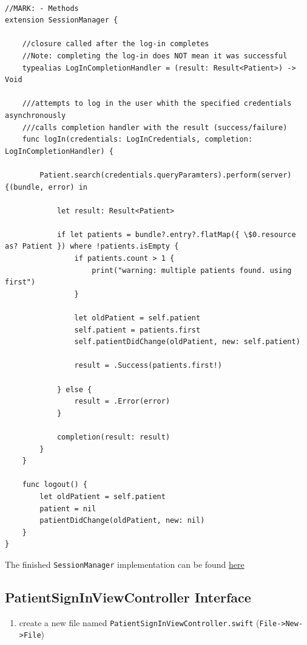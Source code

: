 \documentclass{article}
\begin{document}
\begin{verbatim}

//MARK: - Methods
extension SessionManager {

    //closure called after the log-in completes
    //Note: completing the log-in does NOT mean it was successful
    typealias LogInCompletionHandler = (result: Result<Patient>) -> Void

    ///attempts to log in the user whith the specified credentials asynchronously
    ///calls completion handler with the result (success/failure)
    func logIn(credentials: LogInCredentials, completion: LogInCompletionHandler) {

        Patient.search(credentials.queryParamters).perform(server) {(bundle, error) in

            let result: Result<Patient>

            if let patients = bundle?.entry?.flatMap({ \$0.resource as? Patient }) where !patients.isEmpty {
                if patients.count > 1 {
                    print("warning: multiple patients found. using first")
                }

                let oldPatient = self.patient
                self.patient = patients.first
                self.patientDidChange(oldPatient, new: self.patient)

                result = .Success(patients.first!)

            } else {
                result = .Error(error)
            }

            completion(result: result)
        }
    }

    func logout() {
        let oldPatient = self.patient
        patient = nil
        patientDidChange(oldPatient, new: nil)
    }
}
\end{verbatim}

The finished \texttt{SessionManager} implementation can be found
\href{resources/step5/SessionManager.swift}{here}

\subsection{PatientSignInViewController
Interface}\label{step5-1}

\begin{enumerate}
\def\labelenumi{\arabic{enumi}.}

\item
  create a new file named \texttt{PatientSignInViewController.swift}
  (\texttt{File-\textgreater{}New-\textgreater{}File})
\end{enumerate}
\end{document}
